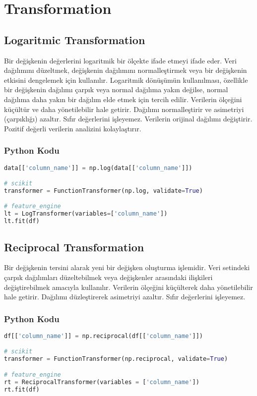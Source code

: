 \section{Transformation}

\subsection{Logaritmic Transformation}
Bir değişkenin değerlerini logaritmik bir ölçekte ifade etmeyi ifade eder. Veri dağılımını düzeltmek, değişkenin dağılımını normalleştirmek veya bir değişkenin etkisini dengelemek için kullanılır. Logaritmik dönüşümün kullanılması, özellikle bir değişkenin dağılımı çarpık veya normal dağılıma yakın değilse, normal dağılıma daha yakın bir dağılım elde etmek için tercih edilir. Verilerin ölçeğini küçültür ve daha yönetilebilir hale getirir. Dağılımı normalleştirir ve asimetriyi (çarpıklığı) azaltır. Sıfır değerlerini işleyemez. Verilerin orijinal dağılımı değiştirir. Pozitif değerli verilerin analizini kolaylaştırır.

\subsubsection{Python Kodu}

\begin{lstlisting}[language=Python]
data[['column_name']] = np.log(data[['column_name']])

# scikit
transformer = FunctionTransformer(np.log, validate=True)

# feature_engine
lt = LogTransformer(variables=['column_name'])
lt.fit(df)
\end{lstlisting}

\subsection{Reciprocal Transformation}
Bir değişkenin tersini alarak yeni bir değişken oluşturma işlemidir. Veri setindeki çarpık dağılımları düzeltebilmek veya değişkenler arasındaki ilişkileri değiştirebilmek amacıyla kullanılır. Verilerin ölçeğini küçülterek daha yönetilebilir hale getirir. Dağılımı düzleştirerek asimetriyi azaltır. Sıfır değerlerini işleyemez.

\subsubsection{Python Kodu}

\begin{lstlisting}[language=Python]
df[['column_name']] = np.reciprocal(df[['column_name']])

# scikit
transformer = FunctionTransformer(np.reciprocal, validate=True)

# feature_engine
rt = ReciprocalTransformer(variables = ['column_name'])
rt.fit(df)
\end{lstlisting}

